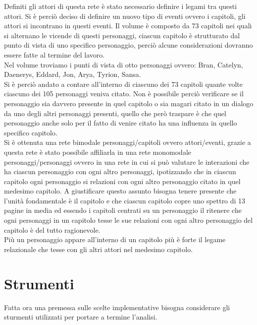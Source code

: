 \documentclass[a4paper]{article}
\begin{document}
Definiti gli attori di questa rete è stato necessario definire i legami tra questi attori. Si è perciò deciso di definire un nuovo tipo di eventi ovvero i capitoli, gli attori si incontrano in questi eventi. Il volume è composto da 73 capitoli nei quali si alternano le vicende di questi personaggi, ciascun capitolo è strutturato dal punto di vista di uno specifico personaggio, perciò alcune considerazioni dovranno essere fatte al termine del lavoro.\\
Nel volume troviamo i punti di vista di otto personaggi ovvero: Bran, Catelyn, Daenerys, Eddard, Jon, Arya, Tyrion, Sansa.\\
Si è perciò andato a contare all'interno di ciascuno dei 73 capitoli quante volte ciascuno dei 105 personaggi veniva citato. Non è possibile perciò verificare se il personaggio sia davvero presente in quel capitolo o sia magari citato in un dialogo da uno degli altri personaggi presenti, quello che però traspare è che quel personaggio anche solo per il fatto di venire citato ha una influenza in quello specifico capitolo.\\
Si è ottenuta una rete bimodale personaggi/capitoli ovvero attori/eventi, grazie a questa rete è stato possibile affiliarla in una rete monomodale personaggi/personaggi ovvero in una rete in cui si può valutare le interazioni che ha ciascun personaggio con ogni altro personaggi, ipotizzando che in ciascun capitolo ogni personaggio si relazioni con ogni altro personaggio citato in quel medesimo capitolo. A giustificare questo assunto bisogna tenere presente che l'unità fondamentale è il capitolo e che ciascun capitolo copre uno spettro di 13 pagine in media ed essendo i capitoli centrati su un personaggio il ritenere che ogni personaggi in un capitolo tesse le sue relazioni con ogni altro personaggio del capitolo è del tutto ragionevole.\\ 
Più un personaggio appare all'interno di un capitolo più è forte il legame relazionale che tesse con gli altri attori nel medesimo capitolo.

\section{Strumenti}
Fatta ora una premessa sulle scelte implementative bisogna considerare gli sturmenti utilizzati per portare a termine l'analisi.\\
\end{document}
